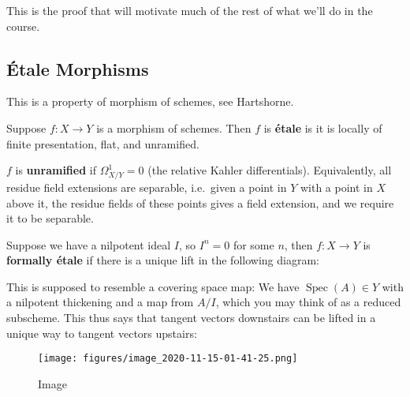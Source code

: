 This is the proof that will motivate much of the rest of what we'll do
in the course.

\hypertarget{uxe9tale-morphisms}{%
\subsection{Étale Morphisms}\label{uxe9tale-morphisms}}

This is a property of morphism of schemes, see Hartshorne.

\begin{definition}

Suppose \(f:X\to Y\) is a morphism of schemes. Then \(f\) is
\textbf{étale} is it is locally of finite presentation, flat, and
unramified.

\end{definition}

\begin{definition}[Unramified]

\(f\) is \textbf{unramified} if \(\Omega_{X/Y}^1 = 0\) (the relative
Kahler differentials). Equivalently, all residue field extensions are
separable, i.e.~given a point in \(Y\) with a point in \(X\) above it,
the residue fields of these points gives a field extension, and we
require it to be separable.

\end{definition}

\begin{definition}

Suppose we have a nilpotent ideal \(I\), so \(I^n = 0\) for some \(n\),
then \(f:X\to Y\) is \textbf{formally étale} if there is a unique lift
in the following diagram:

\end{definition}

\begin{remark}

This is supposed to resemble a covering space map: We have
\(\operatorname{Spec}(A) \in Y\) with a nilpotent thickening and a map
from \(A/I\), which you may think of as a reduced subscheme. This thus
says that tangent vectors downstairs can be lifted in a unique way to
tangent vectors upstairs:

\begin{figure}
\centering
\texttt{[image: figures/image\_2020-11-15-01-41-25.png]}
\caption{Image}
\end{figure}

\end{remark}

